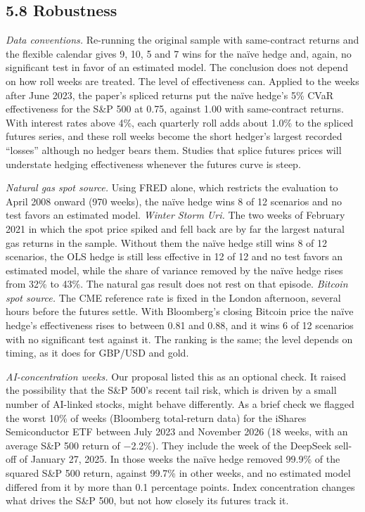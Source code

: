 \documentclass[11pt,letterpaper]{article}
\begin{document}
\subsection*{5.8 Robustness}

\textit{Data conventions.} Re-running the original sample with same-contract returns and the flexible calendar gives 9, 10, 5 and 7 wins for the naïve hedge and, again, no significant test in favor of an estimated model. The conclusion does not depend on how roll weeks are treated. The level of effectiveness can. Applied to the weeks after June 2023, the paper's spliced returns put the naïve hedge's 5\% CVaR effectiveness for the S\&P 500 at 0.75, against 1.00 with same-contract returns. With interest rates above 4\%, each quarterly roll adds about 1.0\% to the spliced futures series, and these roll weeks become the short hedger's largest recorded “losses” although no hedger bears them. Studies that splice futures prices will understate hedging effectiveness whenever the futures curve is steep.

\textit{Natural gas spot source.} Using FRED alone, which restricts the evaluation to April 2008 onward (970 weeks), the naïve hedge wins 8 of 12 scenarios and no test favors an estimated model. \textit{Winter Storm Uri.} The two weeks of February 2021 in which the spot price spiked and fell back are by far the largest natural gas returns in the sample. Without them the naïve hedge still wins 8 of 12 scenarios, the OLS hedge is still less effective in 12 of 12 and no test favors an estimated model, while the share of variance removed by the naïve hedge rises from 32\% to 43\%. The natural gas result does not rest on that episode. \textit{Bitcoin spot source.} The CME reference rate is fixed in the London afternoon, several hours before the futures settle. With Bloomberg's closing Bitcoin price the naïve hedge's effectiveness rises to between 0.81 and 0.88, and it wins 6 of 12 scenarios with no significant test against it. The ranking is the same; the level depends on timing, as it does for GBP/USD and gold.

\textit{AI-concentration weeks.} Our proposal listed this as an optional check. It raised the possibility that the S\&P 500's recent tail risk, which is driven by a small number of AI-linked stocks, might behave differently. As a brief check we flagged the worst 10\% of weeks (Bloomberg total-return data) for the iShares Semiconductor ETF between July 2023 and November 2026 (18 weeks, with an average S\&P 500 return of −2.2\%). They include the week of the DeepSeek sell-off of January 27, 2025. In those weeks the naïve hedge removed 99.9\% of the squared S\&P 500 return, against 99.7\% in other weeks, and no estimated model differed from it by more than 0.1 percentage points. Index concentration changes what drives the S\&P 500, but not how closely its futures track it.
\end{document}

